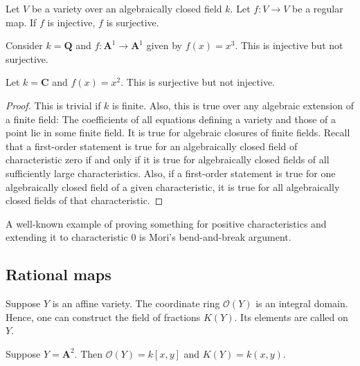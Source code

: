 \documentclass [11 pt, oneside, margin = 1 in] {article}
\begin{document}
\begin{theorem}[Ax--Grothendieck]\label{}\text{}
Let $V$ be a variety over an algebraically closed field $k$. Let $f:V\longrightarrow V$ be a regular map. If $f$ is injective, $f$ is surjective.
\end{theorem}

\begin{example}\label{}\text{}
Consider $k= \mathbf{Q}$ and $f:\mathbf{A}^1\longrightarrow \mathbf{A}^1$ given by $f(x)=x^ 3$. This is injective but not surjective.
\end{example}

\begin{example}\label{}\text{}
Let $k=\mathbf{C}$ and $f(x)=x^2$. This is surjective but not injective.
\end{example}

\begin{proof}
This is trivial if $k$ is finite. Also, this is true over any algebraic extension of a finite field: The coefficients of all equations defining a variety and those of a point lie in some finite field. It is true for algebraic closures of finite fields. Recall that a first-order statement is true for an algebraically closed field of characteristic zero if and only if it is true for algebraically closed fields of all sufficiently large characteristics. Also, if a first-order statement is true for one algebraically closed field of a given characteristic, it is true for all algebraically closed fields of that characteristic.
\end{proof}

\begin{remark}
	A well-known example of proving something for positive characteristics and extending it to characteristic $0$ is Mori's bend-and-break argument.
\end{remark}

\subsection{Rational maps}
Suppose $Y$ is an affine variety. The coordinate ring $\mathscr{O}(Y)$ is an integral domain. Hence, one can construct the field of fractions $K(Y)$. Its elements are called  on $Y$.

\begin{example}[ ]\label{}\text{}
Suppose $Y=\mathbf{A}^2$. Then $\mathscr{O}(Y) = k[x,y]$ and $K(Y) =k(x,y)$. 
\end{example}
\end{document}
